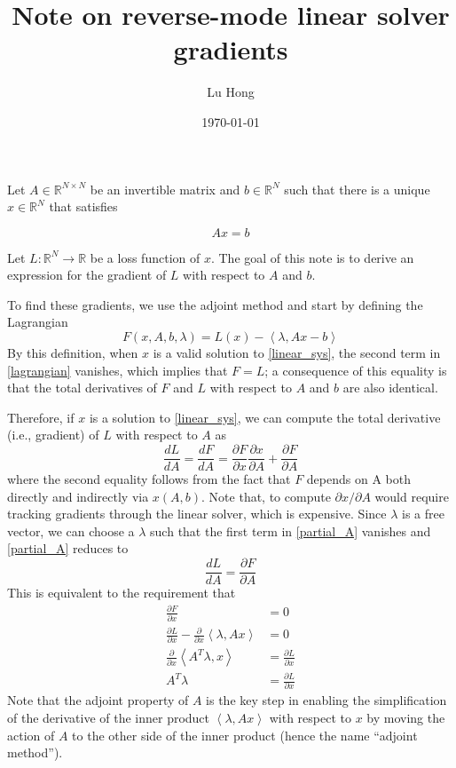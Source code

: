 \documentclass[11pt, a4paper]{article}
\title{Note on reverse-mode linear solver gradients}
\author{Lu Hong}
\date{\today}
\begin{document}
\maketitle

Let $A\in\mathbb R^{N\times N}$ be an invertible matrix and $b\in\mathbb R^{N}$ such that there is a unique $x\in\mathbb R^N$ that satisfies

\begin{equation}
    Ax=b \label{linear_sys}
\end{equation}

Let $L:\mathbb R^N\to \mathbb R$ be a loss function of $x$. The goal of this note is to derive an expression for the gradient of $L$ with respect to $A$ and $b$.

To find these gradients, we use the adjoint method and start by defining the Lagrangian
\begin{equation}
    F(x, A, b, \lambda) = L(x) - \left<\lambda, Ax-b\right> \label{lagrangian}
\end{equation}
By this definition, when $x$ is a valid solution to \eqref{linear_sys}, the second term in \eqref{lagrangian} vanishes, which implies that $F=L$; a consequence of this equality is that the total derivatives of $F$ and $L$ with respect to $A$ and $b$ are also identical.

Therefore, if $x$ is a solution to \eqref{linear_sys}, we can compute the total derivative (i.e., gradient) of $L$ with respect to $A$ as
\begin{equation}
    \frac{dL}{dA} = \frac{dF}{dA} = \frac{\partial F}{\partial x}\frac{\partial x}{\partial A} + \frac{\partial F}{\partial A} \label{partial_A}
\end{equation}
where the second equality follows from the fact that $F$ depends on A both directly and indirectly via $x(A, b)$. Note that, to compute $\partial x/\partial A$ would require tracking gradients through the linear solver, which is expensive. Since $\lambda$ is a free vector, we can choose a $\lambda$ such that the first term in \eqref{partial_A} vanishes and \eqref{partial_A} reduces to
\begin{equation}
    \frac{dL}{dA} = \frac{\partial F}{\partial A} \label{partial_A_simplified}
\end{equation}
This is equivalent to the requirement that
\begin{align}
    \frac{\partial F}{\partial x} & = 0 \\
    \frac{\partial L}{\partial x} - \frac{\partial}{\partial x}\left<\lambda, Ax\right> & = 0 \\
    \frac{\partial}{\partial x}\left<A^T\lambda, x\right> & = \frac{\partial L}{\partial x} \\ 
    A^T\lambda & = \frac{\partial L}{\partial x} \label{lambda_linear_sys}
\end{align}
Note that the adjoint property of $A$ is the key step in enabling the simplification of the derivative of the inner product $\left<\lambda, Ax\right>$ with respect to $x$ by moving the action of $A$ to the other side of the inner product (hence the name ``adjoint method'').
\end{document}
